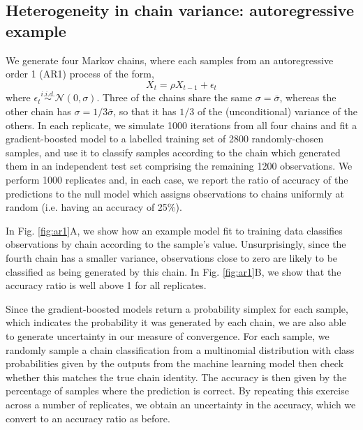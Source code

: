 \documentclass{article}
\begin{document}
\subsection{Heterogeneity in chain variance: autoregressive example}\label{sec:heterogeneity}
We generate four Markov chains, where each samples from an autoregressive order 1 (AR1) process of the form,
%
\begin{equation}
X_t = \rho X_{t-1} + \epsilon_t
\end{equation}
%
where $\epsilon_t\stackrel{i.i.d.}{\sim}\mathcal{N}(0, \sigma)$. Three of the chains share the same $\sigma=\bar{\sigma}$, whereas the other chain has $\sigma=1/3\bar{\sigma}$, so that it has $1/3$ of the (unconditional) variance of the others. In each replicate, we simulate 1000 iterations from all four chains and fit a gradient-boosted model to a labelled training set of 2800 randomly-chosen samples, and use it to classify samples according to the chain which generated them in an independent test set comprising the remaining 1200 observations. We perform 1000 replicates and, in each case, we report the ratio of accuracy of the predictions to the null model which assigns observations to chains uniformly at random (i.e. having an accuracy of 25\%).

In Fig. \ref{fig:ar1}A, we show how an example model fit to training data classifies observations by chain according to the sample's value. Unsurprisingly, since the fourth chain has a smaller variance, observations close to zero are likely to be classified as being generated by this chain. In Fig. \ref{fig:ar1}B, we show that the accuracy ratio is well above 1 for all replicates.


Since the gradient-boosted models return a probability simplex for each sample, which indicates the probability it was generated by each chain, we are also able to generate uncertainty in our measure of convergence. For each sample, we randomly sample a chain classification from a multinomial distribution with class probabilities given by the outputs from the machine learning model then check whether this matches the true chain identity. The accuracy is then given by the percentage of samples where the prediction is correct. By repeating this exercise across a number of replicates, we obtain an uncertainty in the accuracy, which we convert to an accuracy ratio as before.
\end{document}
